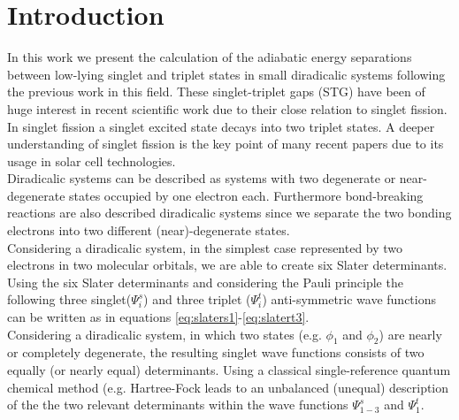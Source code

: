 \documentclass[aip,graphicx,amsmath,reprint]{revtex4-1}
\begin{document}
\pacs{}%

\maketitle %

\section{Introduction}
In this work we present the calculation of the adiabatic energy separations between low-lying singlet and triplet states in small diradicalic systems following the previous work in this field.\cite{Krylov2002, Ziegler2005, Krylov2003, Yang2015, Yang2011} These singlet-triplet gaps (STG) have been of huge interest in recent scientific work due to their close relation to singlet fission.\cite{Michl2006, Michl2010, Michl2013} In singlet fission a singlet excited state decays into two triplet states. A deeper understanding of singlet fission is the key point of many recent papers due to its usage in solar cell technologies. \cite{Michl2006, Michl2010-2, Baldo2011, Musgrave2010,Greenham2012}\\
Diradicalic systems can be described as systems with two degenerate or near-degenerate states occupied by one electron each.\cite{Salem1972} Furthermore bond-breaking reactions are also described diradicalic systems since we separate the two bonding electrons into two different (near)-degenerate states.\\
Considering a diradicalic system, in the simplest case represented by two electrons in two molecular orbitals, we are able to create six Slater determinants. Using the six Slater determinants and considering the Pauli principle\cite{Pauli1925} the following three singlet($\Psi^{s}_i$) and three triplet ($\Psi^{t}_i$) anti-symmetric wave functions can be written as in equations  \eqref{eq:slaters1}-\eqref{eq:slatert3}.
\\
Considering a diradicalic system, in which two states (e.g. $\phi_1$ and $\phi_2$) are nearly or completely degenerate, the resulting singlet wave functions consists of two equally (or nearly equal) determinants. Using a classical single-reference quantum chemical method (e.g. Hartree-Fock\cite{Hartree1928, Fock1930} leads to an unbalanced (unequal) description of the the two relevant determinants within the wave functions $\Psi^{s}_{1-3}$ and $\Psi^{t}_1$.
\end{document}
